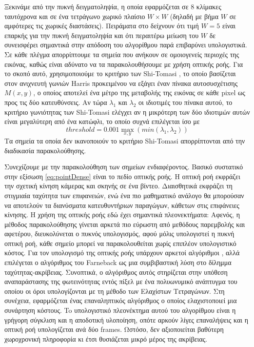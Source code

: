 \documentclass[11pt,a4paper,english,greek,twoside]{../Thesis}
\begin{document}
\par Ξεκινάμε από την πυκνή δειγματοληψία, η οποία εφαρμόζεται σε $8$ κλίμακες ταυτόχρονα και σε ένα τετράγωνο χωρικό πλαίσιο $W \times W$ (δηλαδή με βήμα $W$ σε αμφότερες τις χωρικές διαστάσεις). Πειράματα στο \cite{wang_2011} δείχνουν ότι τιμή $W=5$ είναι επαρκής για την πυκνή δειγματοληψία και ότι περαιτέρω μείωση του $W$ δε συνεισφέρει σημαντικά στην απόδοση του αλγορίθμου παρά επιβαρύνει υπολογιστικά. Σε κάθε πλέγμα απορρίπτουμε τα σημεία που ανήκουν σε ομοιογενείς περιοχές της εικόνας, καθώς είναι αδύνατο να τα παρακολουθήσουμε με χρήση οπτικής ροής. Για το σκοπό αυτό, χρησιμοποιούμε το κριτήριο των Shi-Tomasi \cite{shi_1994}, το οποίο βασίζεται στον ανιχνευτή γωνιών Harris \cite{harris_1988} προκειμένου να εξάγει έναν πίνακα αυτοσυσχέτισης $M(x,y)$, ο οποίος αποτελεί ένα μέτρο της μεταβολής της εικόνας σε κάθε pixel ως προς τις δύο κατευθύνσεις. Αν τώρα $\lambda _1$ και $\lambda _2$ οι ιδιοτιμές του πίνακα αυτού, το κριτήριο γωνιότητας των Shi-Tomasi ελέγχει αν η μικρότερη των δύο ιδιοτιμών αυτών είναι μεγαλύτερη από ένα κατώφλι, το οποίο συχνά επιλέγεται ίσο με $$threshold=0.001\max_{x,y}{(min(\lambda _1,\lambda _2))}$$ Τα σημεία τα οποία δεν ικανοποιούν το κριτήριο Shi-Tomasi απορρίπτονται από την διαδικασία παρακολούθησης.

\par Συνεχίζουμε με την παρακολούθηση των σημείων ενδιαφέροντος. Βασικό συστατικό στην εξίσωση \eqref{eq:pointDense} είναι το πεδίο οπτικής ροής. Η οπτική ροή εκφράζει την σχετική κίνηση κάμερας και σκηνής σε ένα βίντεο. Διαισθητικά εκφράζει τη στιγμιαία ταχύτητα των επιφανειών, ενώ ένα πιο μαθηματικό ανάλογο θα μπορούσαν να αποτελούν τα διανύσματα κατευθυντήριων παραγώγων, κάθετων στις επιφάνειες κίνησης. Η χρήση της οπτικής ροής εδώ έχει σημαντικά πλεονεκτήματα: Αφενός, η μέθοδος παρακολούθησης γίνεται αρκετά πιο εύρωστη από μεθόδους παρεμβολής και αφετέρου, διευκολύνεται ο πυκνός υπολογισμός, αφού μόλις υπολογιστεί η πυκνή οπτική ροή, κάθε σημείο μπορεί να παρακολουθείται χωρίς επιπλέον υπολογιστικό κόστος. Για τον υπολογισμό της οπτικής ροής υπάρχουν αρκετοί αλγόριθμοι \cite{lucas_1981}, αλλά επιλέγεται ο αλγόριθμος του Farneback ως μια συμβιβαστική λύση στο δίλημμα ταχύτητας-ακρίβειας. Συνοπτικά, ο αλγόριθμος αυτός στηρίζεται στην υπόθεση αναπαράστασης της φωτεινότητας εντός πίξελ με ένα πολυωνυμικό ανάπτυγμα του οποίου οι όροι υπολογίζονται με τη μέθοδο των Ελαχίστων Τετραγώνων. Στη συνέχεια, εφαρμόζεται ένας επαναληπτικός αλγόριθμος ο οποίος ελαχιστοποιεί μια συνάρτηση κόστους. To υπολογιστικό πλεονέκτημα αυτού του αλγορίθμου είναι η γρήγορη σύγκλιση και η αποδοτική υλοποίηση, οπότε αρκούν λίγες επαναλήψεις και η οπτική ροή υπολογίζεται ανά δύο frames. Ωστόσο, δεν αξιοποιείται βαθύτερη χωροχρονική πληροφορία κι έτσι θυσιάζεται μικρό μέρος της ακρίβειας.
\end{document}
